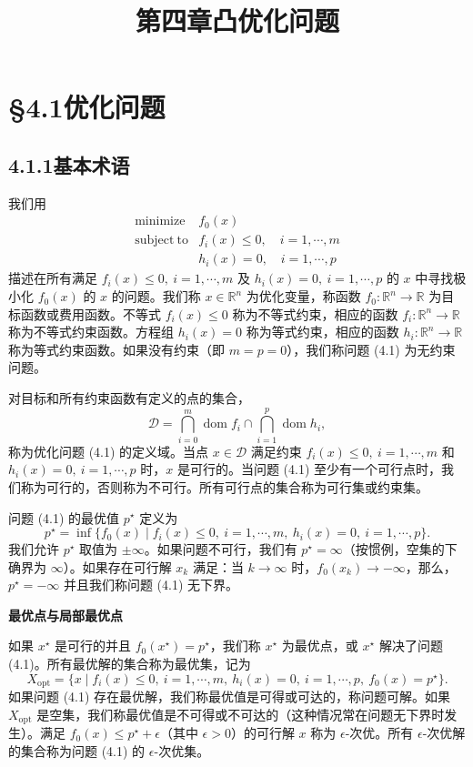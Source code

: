 \documentclass[UTF8, 12pt, fontset=fandol, oneside]{ctexart}
\title{第四章\quad 凸优化问题}
\author{}
\date{}
\begin{document}
\maketitle

\section*{§4.1\quad 优化问题}

\subsection*{4.1.1\quad 基本术语}

我们用
\begin{equation}
\begin{array}{ll}
\mathop{\mathrm{minimize}} & f_0(x)\\
\mathrm{subject\ to} & f_i(x)\leq 0,\quad i=1,\cdots,m\\
& h_i(x)=0,\quad i=1,\cdots,p
\end{array}
\tag{4.1}
\end{equation}
描述在所有满足 $f_i(x)\leq 0,\ i=1,\cdots,m$ 及 $h_i(x)=0,\ i=1,\cdots,p$ 的 $x$ 中寻找极小化 $f_0(x)$ 的 $x$ 的问题。我们称 $x\in\mathbb{R}^n$ 为优化变量，称函数 $f_0:\mathbb{R}^n\to\mathbb{R}$ 为目标函数或费用函数。不等式 $f_i(x)\leq 0$ 称为不等式约束，相应的函数 $f_i:\mathbb{R}^n\to\mathbb{R}$ 称为不等式约束函数。方程组 $h_i(x)=0$ 称为等式约束，相应的函数 $h_i:\mathbb{R}^n\to\mathbb{R}$ 称为等式约束函数。如果没有约束（即 $m=p=0$），我们称问题 (4.1) 为无约束问题。

对目标和所有约束函数有定义的点的集合，
\[
\mathcal{D}=\bigcap_{i=0}^{m}\operatorname{dom} f_i\cap\bigcap_{i=1}^{p}\operatorname{dom} h_i,
\]
称为优化问题 (4.1) 的定义域。当点 $x\in\mathcal{D}$ 满足约束 $f_i(x)\leq 0,\ i=1,\cdots,m$ 和 $h_i(x)=0,\ i=1,\cdots,p$ 时，$x$ 是可行的。当问题 (4.1) 至少有一个可行点时，我们称为可行的，否则称为不可行。所有可行点的集合称为可行集或约束集。

问题 (4.1) 的最优值 $p^\star$ 定义为
\[
p^\star=\inf\{f_0(x)\mid f_i(x)\leq 0,\ i=1,\cdots,m,\ h_i(x)=0,\ i=1,\cdots,p\}.
\]
我们允许 $p^\star$ 取值为 $\pm\infty$。如果问题不可行，我们有 $p^\star=\infty$（按惯例，空集的下确界为 $\infty$）。如果存在可行解 $x_k$ 满足：当 $k\to\infty$ 时，$f_0(x_k)\to-\infty$，那么，$p^\star=-\infty$ 并且我们称问题 (4.1) 无下界。

\noindent\textbf{最优点与局部最优点}

如果 $x^\star$ 是可行的并且 $f_0(x^\star)=p^\star$，我们称 $x^\star$ 为最优点，或 $x^\star$ 解决了问题 (4.1)。所有最优解的集合称为最优集，记为
\[
X_{\mathrm{opt}}=\{x\mid f_i(x)\leq 0,\ i=1,\cdots,m,\ h_i(x)=0,\ i=1,\cdots,p,\ f_0(x)=p^\star\}.
\]
如果问题 (4.1) 存在最优解，我们称最优值是可得或可达的，称问题可解。如果 $X_{\mathrm{opt}}$ 是空集，我们称最优值是不可得或不可达的（这种情况常在问题无下界时发生）。满足 $f_0(x)\leq p^\star+\epsilon$（其中 $\epsilon>0$）的可行解 $x$ 称为 $\epsilon$-次优。所有 $\epsilon$-次优解的集合称为问题 (4.1) 的 $\epsilon$-次优集。
\end{document}
